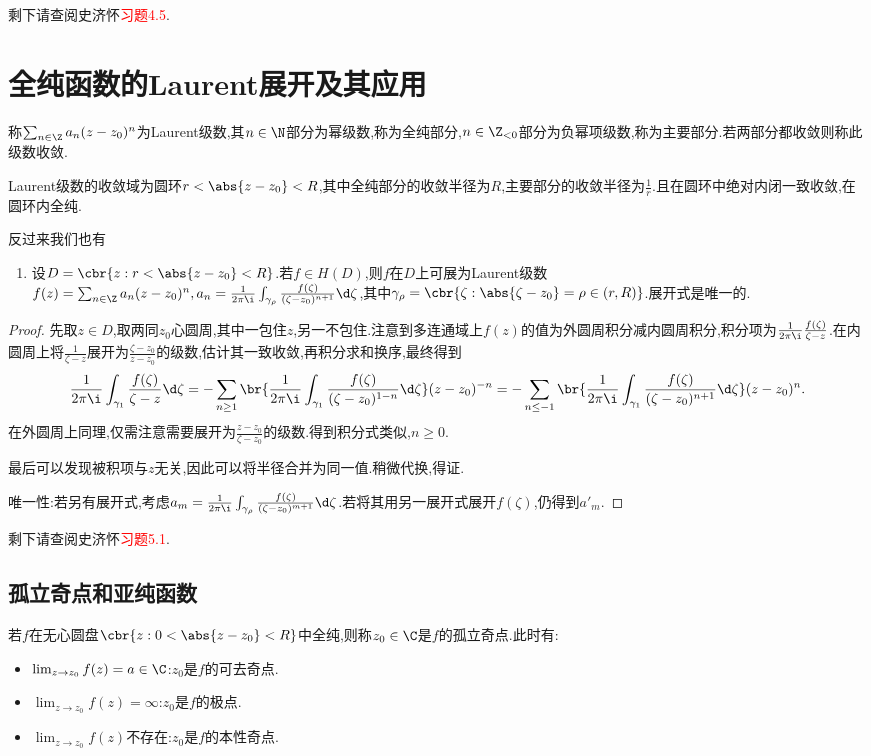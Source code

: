 \documentclass{article}
\newcommand{\exerfunc}[1]{剩下请查阅史济怀\textcolor{red}{习题#1}.}
\begin{document}
\exerfunc{4.5}

\section{全纯函数的Laurent展开及其应用}
称$\sum_{n\in\Z}a_n(z-z_0)^n$为Laurent级数,其$n\in\N$部分为幂级数,称为全纯部分,$n\in\Z_{<0}$部分为负幂项级数,称为主要部分.若两部分都收敛则称此级数收敛.

\dayhrule

Laurent级数的收敛域为圆环$r<\abs{z-z_0}<R$,其中全纯部分的收敛半径为$R$,主要部分的收敛半径为$\frac{1}{r}$.且在圆环中绝对内闭一致收敛,在圆环内全纯.

反过来我们也有\begin{enumerate}
    \item 设$D=\cbr{z:r<\abs{z-z_0}<R}$.若$f\in H(D)$,则$f$在$D$上可展为Laurent级数$f(z)=\sum_{n\in \Z}a_n(z-z_0)^n, a_n=\frac{1}{2\pi\i}\int_{\gamma_\rho}\frac{f(\zeta)}{(\zeta-z_0)^{n+1}}\d\zeta$,其中$\gamma_\rho=\cbr{\zeta:\abs{\zeta-z_0}=\rho\in(r,R)}$.展开式是唯一的.
\end{enumerate}
\begin{proof}
    先取$z\in D$,取两同$z_0$心圆周,其中一包住$z$,另一不包住.注意到多连通域上$f(z)$的值为外圆周积分减内圆周积分,积分项为$\frac{1}{2\pi\i}\frac{f(\zeta)}{\zeta-z}$.在内圆周上将$\frac{1}{\zeta-z}$展开为$\frac{\zeta-z_0}{z-z_0}$的级数,估计其一致收敛,再积分求和换序,最终得到$$\frac{1}{2\pi\i}\int_{\gamma_1}\frac{f(\zeta)}{\zeta-z}\d\zeta=-\sum_{n\geq 1}\br{\frac{1}{2\pi\i}\int_{\gamma_1}\frac{f(\zeta)}{(\zeta-z_0)^{1-n}}\d\zeta}(z-z_0)^{-n}=-\sum_{n\leq -1}\br{\frac{1}{2\pi\i}\int_{\gamma_1}\frac{f(\zeta)}{(\zeta-z_0)^{n+1}}\d\zeta}(z-z_0)^{n}.$$
    在外圆周上同理,仅需注意需要展开为$\frac{z-z_0}{\zeta-z_0}$的级数.得到积分式类似,$n\geq 0$.

    最后可以发现被积项与$z$无关,因此可以将半径合并为同一值.稍微代换,得证.

    唯一性:若另有展开式,考虑$a_m=\frac{1}{2\pi\i}\int_{\gamma_\rho}\frac{f(\zeta)}{(\zeta-z_0)^{m+1}}\d\zeta$.若将其用另一展开式展开$f(\zeta)$,仍得到$a'_m$.
\end{proof}

\exerfunc{5.1}

\subsection{孤立奇点和亚纯函数}
若$f$在无心圆盘$\cbr{z:0<\abs{z-z_0}<R}$中全纯,则称$z_0\in\C$是$f$的孤立奇点.此时有:
\begin{itemize}
    \item $\lim_{z\to z_0}f(z)=a\in\C$:$z_0$是$f$的可去奇点.
    \item $\lim_{z\to z_0}f(z)=\infty$:$z_0$是$f$的极点.
    \item $\lim_{z\to z_0}f(z)$不存在:$z_0$是$f$的本性奇点.
\end{itemize}
\end{document}
